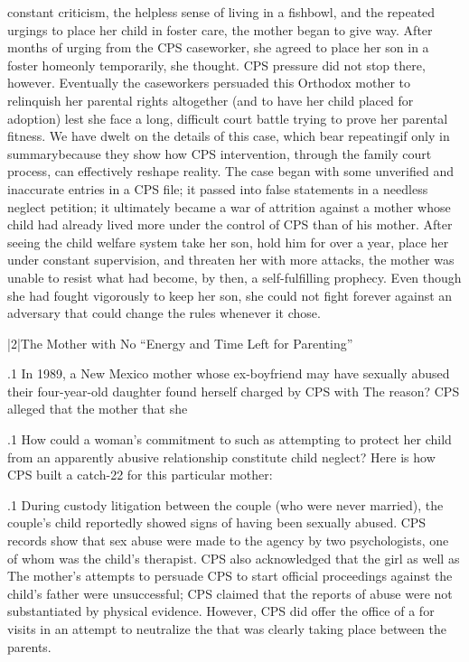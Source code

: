 \documentclass[11pt, twoside]{article}
\begin{document}
{{constant criticism, the helpless sense of living in a fishbowl, and the repeated urgings to place her child in foster care, the mother began to
give way. After months of urging from the CPS caseworker, she agreed
to place her son in a foster home\mdash{}only temporarily, she thought.
CPS pressure did not stop there, however. Eventually the caseworkers
persuaded this Orthodox mother to relinquish her parental rights altogether (and to have her child placed for adoption) lest she face a long,
difficult court battle trying to prove her parental fitness. We
have dwelt on the details of this case, which bear repeating\mdash{}if
only in summary\mdash{}because they show how CPS intervention, through
the family court process, can effectively reshape reality. The case began
with some unverified and inaccurate entries in a CPS file; it passed into
false statements in a needless neglect petition; it ultimately became a war
of attrition against a mother whose child had already lived more under
the control of CPS than of his mother. After seeing the child welfare
system take her son, hold him for over a year, place her under constant
supervision, and threaten her with more attacks, the mother was unable to resist what had become, by then, a self-fulfilling prophecy. Even
though she had fought vigorously to keep her son, she could not fight
forever against an adversary that could change the rules whenever it
chose.
}%


\s|2|{The Mother with No ``Energy and Time Left for Parenting''}

\p.1{%
\noindent{}In 1989, a New Mexico mother whose ex-boyfriend may have sexually
abused their four-year-old daughter found herself charged by CPS with
 The reason? CPS alleged that the mother  that she 
}%

\p.1{%
How could a woman's commitment to  such as attempting to protect her child from an apparently abusive relationship
constitute child neglect? Here is how CPS
built a catch-22 for this particular mother:
}%

\p.1{%
During custody litigation between the couple (who were never married), the couple's child reportedly showed signs of having been sexually
abused. CPS records show that sex abuse  were made to the
agency by two psychologists, one of whom was the child's therapist. CPS
also acknowledged that the girl  as well as  The mother's attempts to persuade CPS
to start official proceedings against the child's father were unsuccessful;
CPS claimed that the reports of abuse were not substantiated by physical
evidence. However, CPS did offer the office of a  for visits
in an attempt to neutralize the  that was clearly taking place
between the parents.
}%

}
\end{document}
